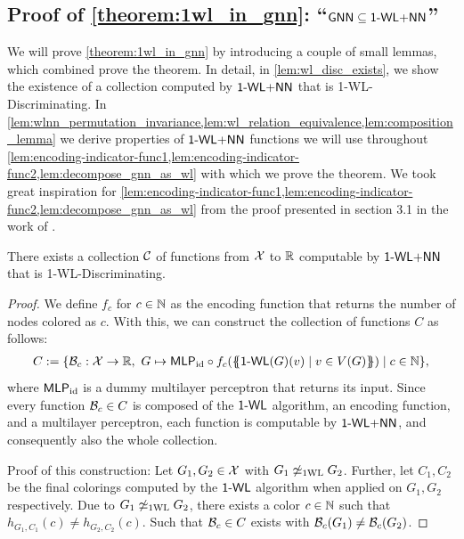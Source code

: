 \subsection{Proof of \cref*{theorem:1wl_in_gnn}: ``$\textsf{GNN} \subseteq \textsf{1-WL+NN}$''}\label{sec:proof_theorem:1wl_in_gnn}
We will prove \autoref{theorem:1wl_in_gnn} by introducing a couple of small lemmas, which combined prove the theorem. In detail, in \autoref{lem:wl_disc_exists}, we show the existence of a collection computed by $\textsf{1-WL+NN}$ that is 1-\!WL-Discriminating. In \cref{lem:wlnn_permutation_invariance,lem:wl_relation_equivalence,lem:composition_lemma} we derive properties of $\textsf{1-WL+NN}$ functions we will use throughout \cref{lem:encoding-indicator-func1,lem:encoding-indicator-func2,lem:decompose_gnn_as_wl} with which we prove the theorem.
We took great inspiration for \cref{lem:encoding-indicator-func1,lem:encoding-indicator-func2,lem:decompose_gnn_as_wl} from the proof presented in section 3.1 in the work of \cite{Chen2019}.

\begin{lemma}\label{lem:wl_disc_exists}
    There exists a collection $\mathcal{C}$ of functions from $\mathcal{X}$ to $\mathbb{R}$ computable by $\textsf{1-WL+NN}$ that is 1-\!WL-Discriminating.
\end{lemma}

\begin{proof}
    We define $f_c$ for $c \in \mathbb{N}$ as the encoding function that returns the number of nodes colored as $c$. With this, we can construct the collection of functions $C$ as follows:
    \begin{align*}
        C := \{ \mathcal{B}_c: \mathcal{X} \rightarrow \mathbb{R}, \ G \mapsto \textsf{MLP}_\text{id} \circ f_c (\{\!\!\{ \textsf{1-WL}(G)(v) \mid v \in V(G) \}\!\!\}) \mid c \in \mathbb{N}\},
    \end{align*}
    where $\textsf{MLP}_\text{id}$ is a dummy multilayer perceptron that returns its input. Since every function $\mathcal{B}_c \in C$ is composed of the $\textsf{1-WL}$ algorithm, an encoding function, and a multilayer perceptron, each function is computable by $\textsf{1-WL+NN}$, and consequently also the whole collection.

    Proof of this construction:
    Let $G_1, G_2 \in \mathcal{X}$ with $G_1 \not\simeq_{\text{1WL}} G_2$. Further, let $C_1, C_2$ be the final colorings computed by the $\textsf{1-WL}$ algorithm when applied on $G_1, G_2$ respectively. Due to $G_1 \not\simeq_{\text{1WL}} G_2$, there exists a color $c \in \mathbb{N}$ such that $h_{G_1,C_1}(c) \neq h_{G_2,C_2}(c)$. Such that $\mathcal{B}_c \in C$ exists with $\mathcal{B}_c(G_1) \neq \mathcal{B}_c(G_2)$.
\end{proof}

